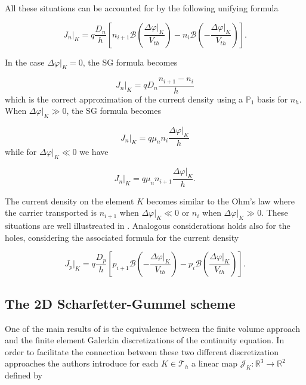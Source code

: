 All these situations can be accounted for by the following unifying formula

 \begin{equation}
\label{eq: scharfetter gummel 1D electron}
J_n|_K=q\frac{D_n}{h}
\left[ n_{i+1}\mathcal{B}\left(\frac{\Delta \varphi|_K}{V_{th}}\right)- n_i\mathcal{B}\left(-\frac{\Delta \varphi|_K}{V_{th}}\right)\right].  
\end{equation}

In the case $\Delta \varphi|_K=0$, the SG formula becomes

\begin{equation}
J_n|_K=qD_n\frac{n_{i+1}-n_{i}}{h}
\end{equation}
which is the correct approximation of the current density using a $\mathbb{P}_1$ basis for $n_h$. When $\Delta \varphi|_K \gg 0$, the SG formula becomes

\begin{equation}
J_n|_K = q\mu_n n_{i}\dfrac{\Delta \varphi|_K}{h}
\end{equation}
while for $\Delta \varphi|_K \ll 0$ we have

\begin{equation}
J_n|_K = q\mu_n n_{i+1}\dfrac{\Delta \varphi|_K}{h}.
\end{equation}

The current density on the element $K$ becomes similar to the Ohm's law where the carrier transported is $n_{i+1}$ when $\Delta \varphi|_K \ll 0$ or $n_i$ when $\Delta \varphi|_K \gg 0$. These situations are well illustreated in .
Analogous considerations holds also for the holes, considering the associated formula for the current density

 \begin{equation}
\label{eq: scharfetter gummel 1D hole}
J_p|_K=q\frac{D_p}{h}
\left[ p_{i+1}\mathcal{B}\left(-\frac{\Delta \varphi|_K}{V_{th}}\right)- p_i\mathcal{B}\left(\frac{\Delta \varphi|_K}{V_{th}}\right)\right].  
\end{equation}


\subsection{The 2D Scharfetter-Gummel scheme}

One of the main results of \cite{Bank:FEvsBOX} is the equivalence between the finite volume approach and the finite element Galerkin discretizations of the continuity equation. In order to facilitate the connection between these two different discretization approaches the authors introduce for each $K \in \mathcal{T}_h$ a linear map $\mathcal{J}_{K}:\mathbb{R}^3\rightarrow\mathbb{R}^2$ defined by

